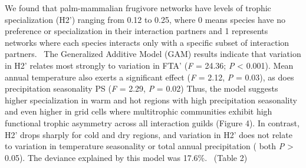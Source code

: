 \documentclass[
]{agujournal2019}
\begin{document}
We found that palm-mammalian frugivore networks have levels of trophic
specialization (H2') ranging from 0.12 to 0.25, where 0 means species
have no preference or specialization in their interaction partners and 1
represents networks where each species interacts only with a specific
subset of interaction partners. ~The Generalized Additive Model (GAM)
results indicate that variation in H2' relates most strongly to
variation in FTA' (\emph{F} = 24.36; \emph{P} \textless{} 0.001). Mean
annual temperature also exerts a significant effect (\emph{F} = 2.12,
\emph{P} = 0.03), as does precipitation seasonality PS (\emph{F} = 2.29,
\emph{P} = 0.02) Thus, the model suggests higher specialization in warm
and hot regions with high precipitation seasonality and even higher in
grid cells where multitrophic communities exhibit high functional
trophic asymmetry across all interaction guilds (Figure 4). In contrast,
H2' drops sharply for cold and dry regions, and variation in H2' does
not relate to variation in temperature seasonality or total annual
precipitation ( both \emph{P} \textgreater{} 0.05). The deviance
explained by this model was 17.6\%. ~(Table 2)

\end{document}
